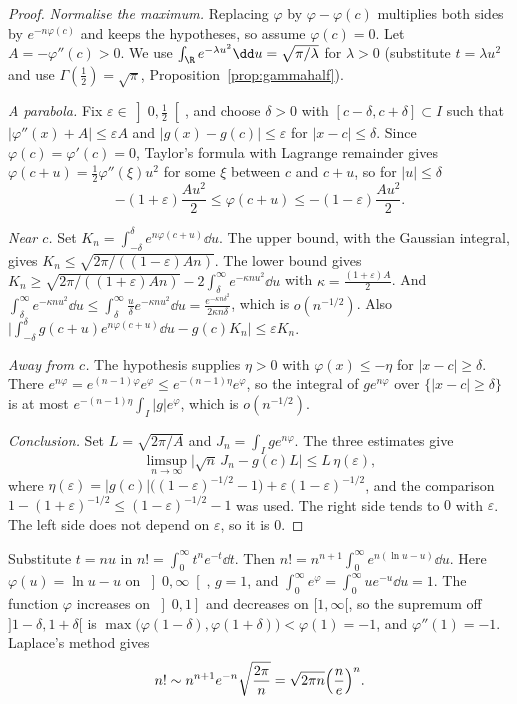 \begin{proof}
\emph{Normalise the maximum.} Replacing $\varphi$ by $\varphi-\varphi(c)$ multiplies both sides by $e^{-n\varphi(c)}$ and keeps the hypotheses, so assume $\varphi(c)=0$. Let $A=-\varphi''(c)>0$. We use $\int_\R e^{-\lambda u^2}\dd u=\sqrt{\pi/\lambda}$ for $\lambda>0$ (substitute $t=\lambda u^2$ and use $\Gamma(\frac12)=\sqrt\pi$, Proposition~\ref{prop:gammahalf}).

\emph{A parabola.} Fix $\varepsilon\in\left]0,\frac12\right[$, and choose $\delta>0$ with $[c-\delta,c+\delta]\subset I$ such that $|\varphi''(x)+A|\le\varepsilon A$ and $|g(x)-g(c)|\le\varepsilon$ for $|x-c|\le\delta$. Since $\varphi(c)=\varphi'(c)=0$, Taylor's formula with Lagrange remainder gives $\varphi(c+u)=\frac12\varphi''(\xi)u^2$ for some $\xi$ between $c$ and $c+u$, so for $|u|\le\delta$
\[
-(1+\varepsilon)\frac{Au^2}2\le\varphi(c+u)\le-(1-\varepsilon)\frac{Au^2}2.
\]

\emph{Near $c$.} Set $K_n=\int_{-\delta}^\delta e^{n\varphi(c+u)}\dd u$. The upper bound, with the Gaussian integral, gives $K_n\le\sqrt{2\pi/((1-\varepsilon)An)}$. The lower bound gives $K_n\ge\sqrt{2\pi/((1+\varepsilon)An)}-2\int_\delta^\infty e^{-\kappa nu^2}\dd u$ with $\kappa=\frac{(1+\varepsilon)A}2$. And $\int_\delta^\infty e^{-\kappa nu^2}\dd u\le\int_\delta^\infty\frac u\delta e^{-\kappa nu^2}\dd u=\frac{e^{-\kappa n\delta^2}}{2\kappa n\delta}$, which is $o(n^{-1/2})$. Also $\bigl|\int_{-\delta}^\delta g(c+u)e^{n\varphi(c+u)}\dd u-g(c)K_n\bigr|\le\varepsilon K_n$.

\emph{Away from $c$.} The hypothesis supplies $\eta>0$ with $\varphi(x)\le-\eta$ for $|x-c|\ge\delta$. There $e^{n\varphi}=e^{(n-1)\varphi}e^\varphi\le e^{-(n-1)\eta}e^\varphi$, so the integral of $ge^{n\varphi}$ over $\{|x-c|\ge\delta\}$ is at most $e^{-(n-1)\eta}\int_I|g|e^\varphi$, which is $o(n^{-1/2})$.

\emph{Conclusion.} Set $L=\sqrt{2\pi/A}$ and $J_n=\int_Ige^{n\varphi}$. The three estimates give
\[
\limsup_{n\to\infty}\bigl|\sqrt n\,J_n-g(c)L\bigr|\le L\,\eta(\varepsilon),
\]
where $\eta(\varepsilon)=|g(c)|\bigl((1-\varepsilon)^{-1/2}-1\bigr)+\varepsilon(1-\varepsilon)^{-1/2}$, and the comparison $1-(1+\varepsilon)^{-1/2}\le(1-\varepsilon)^{-1/2}-1$ was used. The right side tends to $0$ with $\varepsilon$. The left side does not depend on $\varepsilon$, so it is $0$.
\end{proof}

\begin{example}\label{ex:stirlinglaplace}
Substitute $t=nu$ in $n!=\int_0^\infty t^ne^{-t}\dd t$. Then $n!=n^{n+1}\int_0^\infty e^{n(\ln u-u)}\dd u$. Here $\varphi(u)=\ln u-u$ on $\left]0,\infty\right[$, $g=1$, and $\int_0^\infty e^\varphi=\int_0^\infty ue^{-u}\dd u=1$. The function $\varphi$ increases on $\left]0,1\right]$ and decreases on $[1,\infty[$, so the supremum off $]1-\delta,1+\delta[$ is $\max\bigl(\varphi(1-\delta),\varphi(1+\delta)\bigr)<\varphi(1)=-1$, and $\varphi''(1)=-1$. Laplace's method gives
\[
n!\sim n^{n+1}e^{-n}\sqrt{\frac{2\pi}n}=\sqrt{2\pi n}\Bigl(\frac ne\Bigr)^n.
\]
\end{example}

